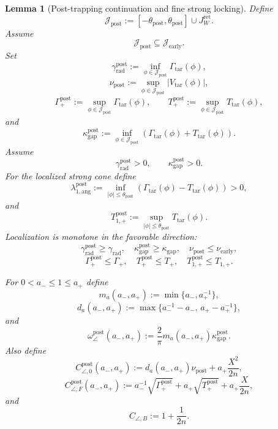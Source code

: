 \documentclass{article} %
\theoremstyle{plain}
\newtheorem{lemma}[theorem]{Lemma}
\theoremstyle{definition}
\theoremstyle{remark}
\begin{document}
\begin{lemma}[Post-trapping continuation and fine strong locking]

Define
\[
\mathcal J_{\mathrm{post}}
:=
[-\theta_{\mathrm{post}},\theta_{\mathrm{post}}]
\cup J_W^{\mathrm{ret}}.
\]
Assume
\[
\mathcal J_{\mathrm{post}}\subseteq\mathcal J_{\mathrm{early}}.
\]
Set
\[
\boxed{
\gamma_{\mathrm{rad}}^{\mathrm{post}}
:=
\inf_{\phi\in\mathcal J_{\mathrm{post}}}\Gamma_{\mathrm{tar}}(\phi),
}
\]
\[
\boxed{
\nu_{\mathrm{post}}
:=
\sup_{\phi\in\mathcal J_{\mathrm{post}}}|V_{\mathrm{tar}}(\phi)|,
}
\]
\[
\boxed{
\Gamma_+^{\mathrm{post}}
:=
\sup_{\phi\in\mathcal J_{\mathrm{post}}}\Gamma_{\mathrm{tar}}(\phi),
\qquad
T_+^{\mathrm{post}}
:=
\sup_{\phi\in\mathcal J_{\mathrm{post}}}T_{\mathrm{tar}}(\phi),
}
\]
and
\[
\boxed{
\kappa_{\mathrm{gap}}^{\mathrm{post}}
:=
\inf_{\phi\in\mathcal J_{\mathrm{post}}}
\left(\Gamma_{\mathrm{tar}}(\phi)+T_{\mathrm{tar}}(\phi)\right).
}
\]
Assume
\[
\gamma_{\mathrm{rad}}^{\mathrm{post}}>0,
\qquad
\kappa_{\mathrm{gap}}^{\mathrm{post}}>0.
\]
For the localized strong cone define
\[
\boxed{
\lambda_{1,\mathrm{ang}}^{\mathrm{post}}
:=
\inf_{|\phi|\le\theta_{\mathrm{post}}}
\left(\Gamma_{\mathrm{tar}}(\phi)-T_{\mathrm{tar}}(\phi)\right)
>0,
}
\]
and
\[
\boxed{
T_{1,+}^{\mathrm{post}}
:=
\sup_{|\phi|\le\theta_{\mathrm{post}}}T_{\mathrm{tar}}(\phi).
}
\]
Localization is monotone in the favorable direction:
\[
\boxed{
\gamma_{\mathrm{rad}}^{\mathrm{post}}\ge\gamma_{\mathrm{rad}},
\quad
\kappa_{\mathrm{gap}}^{\mathrm{post}}\ge\kappa_{\mathrm{gap}},
\quad
\nu_{\mathrm{post}}\le\nu_{\mathrm{early}},
}
\]
\[
\boxed{
\Gamma_+^{\mathrm{post}}\le\Gamma_+,
\quad
T_+^{\mathrm{post}}\le T_+,
\quad
T_{1,+}^{\mathrm{post}}\le T_{1,+}.
}
\]

For $0<a_-\le1\le a_+$ define
\[
m_a(a_-,a_+):=\min\{a_-,a_+^{-1}\},
\]
\[
d_a(a_-,a_+)
:=
\max\{a_-^{-1}-a_-,\,a_+-a_+^{-1}\},
\]
and
\[
\boxed{
\omega_\angle^{\mathrm{post}}(a_-,a_+)
:=
\frac2\pi m_a(a_-,a_+)\kappa_{\mathrm{gap}}^{\mathrm{post}}.
}
\]
Also define
\[
C_{\angle,0}^{\mathrm{post}}(a_-,a_+)
:=
d_a(a_-,a_+)\nu_{\mathrm{post}}+a_+\frac{X^2}{2n},
\]
\[
C_{\angle,F}^{\mathrm{post}}(a_-,a_+)
:=
a_-^{-1}\sqrt{\Gamma_+^{\mathrm{post}}}
+a_+\sqrt{T_+^{\mathrm{post}}}
+a_+\frac{X}{2n},
\]
and
\[
C_{\angle,B}:=1+\frac1{2n}.
\]



\end{lemma}
\end{document}
